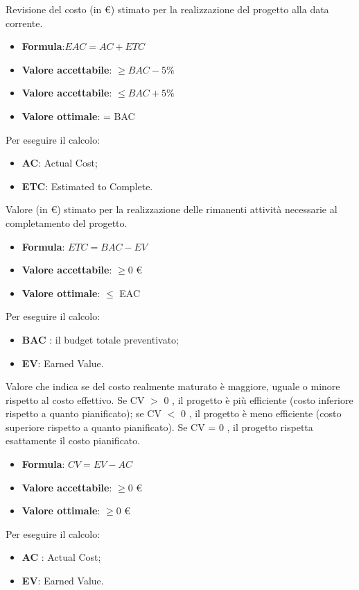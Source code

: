 Revisione del costo (in \euro) stimato per la realizzazione del progetto alla data corrente. 
\begin{itemize}
    \item \textbf{Formula}:$EAC = AC+ETC$
    \item \textbf{Valore accettabile}: $\geq BAC - 5\%$
    \item \textbf{Valore accettabile}: $\leq  BAC + 5\%$
    \item \textbf{Valore ottimale}: = BAC
\end{itemize}  
Per eseguire il calcolo:
\begin{itemize}
    \item \textbf{AC}: Actual Cost;
    \item \textbf{ETC}: Estimated to Complete.
\end{itemize}


Valore (in \euro) stimato per la realizzazione delle rimanenti attività necessarie al completamento del progetto. 
\begin{itemize}
    \item \textbf{Formula}: $ETC=BAC-EV$
    \item \textbf{Valore accettabile}: $\geq0$ \euro
    \item \textbf{Valore ottimale}: $\leq$ EAC
\end{itemize}  
Per eseguire il calcolo:
\begin{itemize}
    \item \textbf{BAC} : il budget totale preventivato;
    \item \textbf{EV}: Earned Value.
\end{itemize}

Valore che indica se del costo realmente maturato è maggiore, uguale o minore rispetto al costo effettivo.
Se CV $>$ 0 , il progetto è più efficiente (costo inferiore rispetto a quanto pianificato); 
se CV $<$ 0 , il progetto è meno efficiente (costo superiore rispetto a quanto pianificato). 
Se CV = 0 , il progetto rispetta esattamente il costo pianificato.
\begin{itemize}
    \item \textbf{Formula}: $CV=EV-AC$
    \item \textbf{Valore accettabile}: $\geq0$ \euro
    \item \textbf{Valore ottimale}: $\geq0$ \euro
\end{itemize}  
Per eseguire il calcolo:
\begin{itemize}
    \item \textbf{AC} : Actual Cost;
    \item \textbf{EV}: Earned Value.
\end{itemize}

